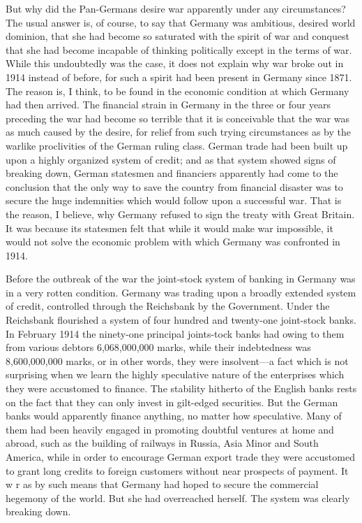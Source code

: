\documentclass{book}
\begin{document}
But why did the Pan-Germans desire war apparently under any circumstances? The usual answer is, of course, to say that Germany was ambitious, desired world dominion, that she had become so saturated with the spirit of war and conquest that she had become incapable of thinking politically except in the terms of war. While this undoubtedly was the case, it does not explain why war broke out in 1914 instead of before, for such a spirit had been present in Germany since 1871. The reason is, I think, to be found in the economic condition at which Germany had then arrived. The financial strain in Germany in the three or four years preceding the war had become so terrible that it is conceivable that the war was as much caused by the desire, for relief from such trying circumstances as by the warlike proclivities of the German ruling class. German trade had been built up upon a highly organized system of credit; and as that system showed signs of breaking down, German statesmen and financiers apparently had come to the conclusion that the only way to save the country from financial disaster was to secure the huge indemnities which would follow upon a successful war. That is the reason, I believe, why Germany refused to sign the treaty with Great Britain. It was because its statesmen felt that while it would make war impossible, it would not solve the economic problem with which Germany was confronted in 1914.

Before the outbreak of the war the joint-stock system of banking in Germany was in a very rotten condition. Germany was trading upon a broadly extended system of credit, controlled through the Reichsbank by the Government. Under the Reichsbank flourished a system of four hundred and twenty-one joint-stock banks. In February 1914 the ninety-one principal joints-tock banks had owing to them from various debtors 6,068,000,000 marks, while their indebtedness was 8,600,000,000 marks, or in other words, they were insolvent—a fact which is not surprising when we learn the highly speculative nature of the enterprises which they were accustomed to finance. The stability hitherto of the English banks rests on the fact that they can only invest in gilt-edged securities. But the German banks would apparently finance anything, no matter how speculative. Many of them had been heavily engaged in promoting doubtful ventures at home and abroad, such as the building of railways in Russia, Asia Minor and South America, while in order to encourage German export trade they were accustomed to grant long credits to foreign customers without near prospects of payment. It w r as by such means that Germany had hoped to secure the commercial hegemony of the world. But she had overreached herself. The system was clearly breaking down.
\end{document}
